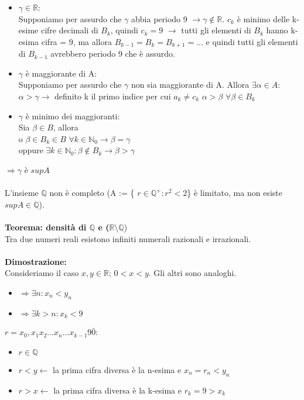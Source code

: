 \documentclass{article}
\begin{document}
\begin{itemize}
    \item $\gamma \in \mathds{R}$:\\
    Supponiamo per assurdo che $\gamma$ abbia periodo 9 $\rightarrow \gamma \notin \mathds{R}$. $c_k$ è minimo delle k-esime cifre decimali di $B_k$, quindi $c_k = 9$ $\rightarrow$ tutti gli elementi di $B_k$ hanno k-esima cifra = 9, ma allora $B_{k-1} = B_k = B_{k + 1} = ...$ e quindi tutti gli elementi di $B_{k-1}$ avrebbero periodo 9 che è assurdo.
    \item $\gamma$ è maggiorante di A:\\
    Supponiamo per assurdo che $\gamma$ non sia maggiorante di A. Allora $\exists \alpha \in A$: $\alpha > \gamma \rightarrow$ definito k il primo indice per cui $a_k \neq c_k$ $\alpha > \beta$ $\forall\beta \in B_k$
    \item $\gamma$ è minimo dei maggioranti:\\
    Sia $\beta \in B$, allora\\
    o $\beta \in B_k \in B$ $\forall k \in \mathds{N}_0 \rightarrow \beta = \gamma$\\
    oppure $\exists k \in \mathds{N}_0: \beta \notin B_k \rightarrow \beta > \gamma$
\end{itemize}
$\Rightarrow \gamma$ è $sup A$\\
\\
L'insieme $\mathds{Q}$ non è completo (A := \{ $r \in \mathds{Q}^+: r^2 < 2$\} è limitato, ma non esiste $sup A \in \mathds{Q}$).\\\\
\textbf{Teorema: densità di $\mathds{Q}$ e ($\mathds{R} \setminus \mathds{Q}$})\\
Tra due numeri reali esistono infiniti numerali razionali e irrazionali.\\\\
\textbf{Dimostrazione:}\\
Consideriamo il caso $x,y \in \mathds{R}$; $0<x<y$. Gli altri sono analoghi.
\begin{itemize}
    \item $\Rightarrow \exists n: x_n < y_n$
    \item $\Rightarrow \exists k>n: x_k<9$
\end{itemize}
$r=x_0,x_1 x_2 ... x_n ... x_{k-1} 9 \bar{0}$: \begin{itemize}
    \item $r \in \mathds{Q}$
    \item $r < y \leftarrow$ la prima cifra diversa è la n-esima e $x_n=r_n<y_n$
    \item $r > x \leftarrow$ la prima cifra diversa è la k-esima e $r_k=9>x_k$
\end{itemize}
\end{document}
